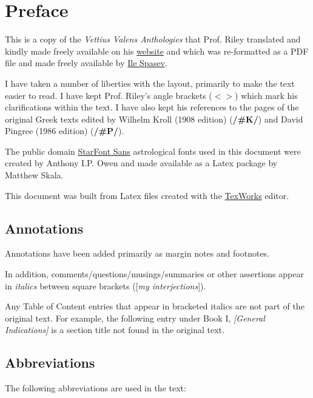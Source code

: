 \chapter{Preface}
This is a copy of the \textit{Vettius Valens Anthologies} that Prof. Riley translated and kindly made freely available on his \href{https://www.csus.edu/indiv/r/rileymt/}{website} and which was re-formatted as a PDF file and made freely available by \href{https://beyondtheheaven.files.wordpress.com/2019/02/valens-atnhologies-1st-ed.-green.pdf}{Ile Spasev}.

I have taken a number of liberties with the layout, primarily to make the text easier to read. I have kept Prof. Riley's angle brackets ($< >$) which mark his clarifications within the text. I have also kept his references to the pages of the original Greek texts edited by Wilhelm Kroll (1908 edition) (\textbf{/\#K/}) and David Pingree (1986 edition) (\textbf{/\#P/}). 

The public domain \href{https://www.ctan.org/pkg/starfont}{StarFont Sans} astrological fonts used in this document were created by Anthony I.P. Owen and made available as a Latex package by Matthew Skala. 

This document was built from Latex files created with the \href{https://www.tug.org/texworks/}{TexWorks} editor.

\section{Annotations}

Annotations have been added primarily as margin notes and footnotes. 

In addition, comments/questions/musings/summaries or other assertions appear in \textit{italics} between square brackets ([\textit{my interjections}]). 

Any Table of Content entries that appear in bracketed italics are not part of the original text. For example, the following entry under Book I, \textit{[General Indications]} is a section title not found in the original text.

\section{Abbreviations}
The following abbreviations are used in the text:

